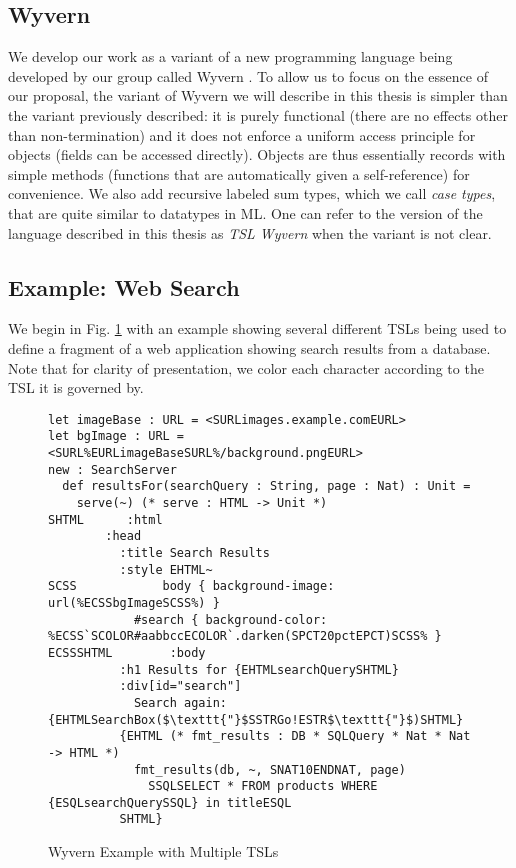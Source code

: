 \subsection{Wyvern}
We develop our work as a variant of a new programming language being developed by our group called Wyvern \cite{Nistor:2013:WST:2489828.2489830}. To allow us to focus on the essence of our proposal, the variant of Wyvern we will describe in this thesis is simpler than the variant previously described: it is purely functional (there are no effects other than non-termination) and it does not enforce a uniform access principle for objects (fields can be accessed directly). Objects are thus essentially records with simple methods (functions that are automatically given a self-reference) for convenience. We also add recursive labeled sum types, which we call \emph{case types}, that are quite similar to datatypes in ML. One can refer to the version of the language described in this thesis as \emph{TSL Wyvern} when the variant is not clear.

\subsection{Example: Web Search}
We begin in Fig. \ref{f-example} with an example showing several different TSLs being used to define a fragment of a web application showing search results from a database. Note that for clarity of presentation, we color each character  according to the TSL it is governed by.
\begin{figure}[t]
\begin{lstlisting}
let imageBase : URL = <SURLimages.example.comEURL>
let bgImage : URL = <SURL%EURLimageBaseSURL%/background.pngEURL>
new : SearchServer
  def resultsFor(searchQuery : String, page : Nat) : Unit =
    serve(~) (* serve : HTML -> Unit *)
SHTML      :html
        :head
          :title Search Results
          :style EHTML~
SCSS            body { background-image: url(%ECSSbgImageSCSS%) }
            #search { background-color: %ECSS`SCOLOR#aabbccECOLOR`.darken(SPCT20pctEPCT)SCSS% }
ECSSSHTML        :body
          :h1 Results for {EHTMLsearchQuerySHTML}
          :div[id="search"]
            Search again: {EHTMLSearchBox($\texttt{"}$SSTRGo!ESTR$\texttt{"}$)SHTML}
          {EHTML (* fmt_results : DB * SQLQuery * Nat * Nat -> HTML *)
            fmt_results(db, ~, SNAT10ENDNAT, page)
              SSQLSELECT * FROM products WHERE {ESQLsearchQuerySSQL} in titleESQL
          SHTML}
\end{lstlisting}
\vspace{-8px}
\caption{Wyvern Example with Multiple TSLs}
\label{f-example}
\vspace{-10px}
\end{figure}
